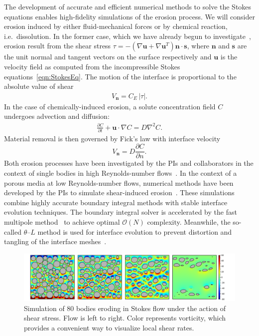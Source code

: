 \documentclass[11pt]{article}
\newcommand{\pd}[2]{ \frac{ \partial #1}{ \partial #2 } }
\newcommand{\bvec}[1]{{\mathbf{#1}}}
\newcommand{\grad}{\nabla}
\newcommand {\Lap} {\grad^2}
\newcommand{\abs}[1]{\left| #1 \right|}
\newcommand{\uu}{\bvec{u}}
\newcommand{\nn}{{\mathbf{n}}}
\renewcommand{\ss}{{\mathbf{s}}}
\newcommand{\Vn}{V_\nn}
\newcommand{\CE}{C_E}
\newcommand {\ny}{n}
\newcommand{\Diff}{D}
\newcommand{\thL}{$\theta$--$L$}
\begin{document}
The development of accurate and efficient numerical methods to solve the Stokes equations enables high-fidelity simulations of the erosion process. We will consider erosion induced by either fluid-mechanical forces or by chemical reaction, i.e.~dissolution. In the former case, which we have already begun to investigate~\cite{Quaife2018}, erosion result from the shear stress $\tau = -\left(\nabla \uu + \nabla \uu^T \right)\nn \cdot \ss$, where $\nn$ and $\ss$ are the unit normal and tangent vectors on the surface respectively and $\uu$ is the velocity field as computed from the incompressible Stokes equations~\eqref{eqn:StokesEq}. The motion of the interface is proportional to the absolute value of shear 
\begin{align}
  \Vn = \CE \, \abs{\tau}.
\end{align}
In the case of chemically-induced erosion, a solute concentration field $C$ undergoes advection and diffusion:
\begin{align}
  \label{Ceq}
  \pd{C}{t} + \uu \cdot \grad C = \Diff \Lap C.
\end{align}
Material removal is then governed by Fick's law with interface velocity
\begin{equation}
\label{DissVn}
\Vn = \Diff \pd{C}{\ny}.
\end{equation}
Both erosion processes have been investigated by the PIs and collaborators in the context of single bodies in high Reynolds-number flows~\cite{Ristroph2012, MoorePOF2013, HuangJFM2015, MooreCPAM2017}. In the context of a porous media at low Reynolds-number flows, numerical methods have been developed by the PIs to simulate shear-induced erosion~\cite{Quaife2018, chi-moo-qua2019}. These simulations combine highly accurate boundary integral methods with stable interface evolution techniques.  The boundary integral solver is accelerated by the fast multipole method~\cite{gre-rok1987, gre-gre-may1992} to achieve optimal $\mathcal{O}(N)$ complexity. Meanwhile, the so-called {\thL} method is used for interface evolution to prevent distortion and tangling of the interface meshes~\cite{hou1994removing, MoorePOF2013, Quaife2018}.

\begin{figure}%
\begin{center}
\includegraphics[width = 0.99 \textwidth]{./figs/80circ8vort.pdf}
\caption{\label{80circ8vort} Simulation of 80 bodies eroding in Stokes flow under the action of shear stress. Flow is left to right. Color represents vorticity, which provides a convenient way to visualize local shear rates. 
}
\end{center}
\end{figure}
 
\end{document}
